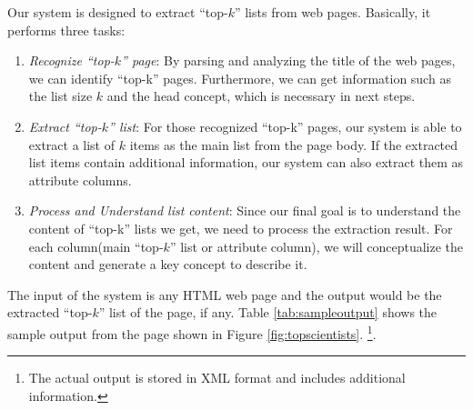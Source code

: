Our system is designed to extract ``top-$k$'' lists from web pages.
Basically, it performs three tasks:
\begin{enumerate}
\item \textit{Recognize ``top-$k$'' page}:
By parsing and analyzing the title of the web pages, we can identify ``top-k'' pages.
Furthermore, we can get information such as the list size $k$ and the head concept,
which is necessary in next steps.

\item \textit{Extract ``top-$k$'' list}:
For those recognized ``top-k'' pages, our system is able to extract a list of $k$ items
as the main list from the page body. If the extracted list items contain additional information,
our system can also extract them as attribute columns.

\item \textit{Process and Understand list content}:
Since our final goal is to understand the content of ``top-k'' lists we get,
we need to process the extraction result. For each column(main ``top-$k$'' list or attribute column),
we will conceptualize the content and generate a key concept to describe it.
\end{enumerate}

The input of the system is any HTML web page
and the output would be the extracted ``top-$k$'' list of the page, if any.
Table \ref{tab:sampleoutput} shows the sample output from the page shown in
Figure \ref{fig:topscientists}.
\footnote{The actual output is stored in XML format and
includes additional information.}.

